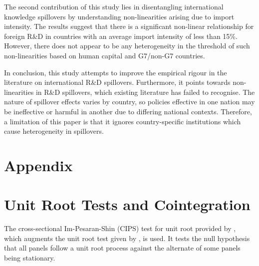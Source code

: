 \documentclass[12pt]{article}
\begin{document}
The second contribution of this study lies in disentangling international knowledge spillovers by understanding non-linearities arising due to import intensity. The results suggest that there is a significant non-linear relationship for foreign R\&D in countries with an average import intensity of less than 15\%. However, there does not appear to be any heterogeneity in the threshold of such non-linearities based on human capital and G7/non-G7 countries.

In conclusion, this study attempts to improve the empirical rigour in the literature on international R\&D spillovers. Furthermore, it points towards non-linearities in R\&D spillovers, which existing literature has failed to recognise. The nature of spillover effects varies by country, so policies effective in one nation may be ineffective or harmful in another due to differing national contexts. Therefore, a limitation of this paper is that it ignores country-specific institutions which cause heterogeneity in spillovers.


\printbibliography[
heading=bibintoc,
title={References}
]

\appendix
\section*{Appendix}


\section{Unit Root Tests and Cointegration} \label{ap: A}

The cross-sectional Im-Pesaran-Shin (CIPS) test for unit root provided by \citet{Pesaran2007}, which augments the unit root test given by \citet{Im2003}, is used. It tests the null hypothesis that all panels follow a unit root process against the alternate of some panels being stationary. 
\end{document}
